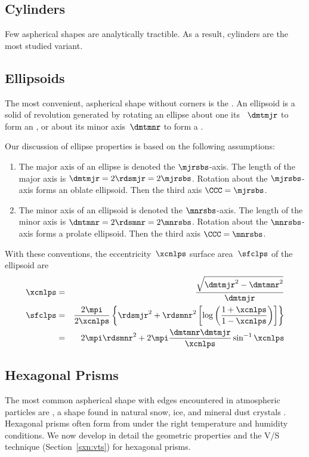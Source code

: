 \documentclass[12pt,twoside]{book}
\begin{document}
\subsection[Cylinders]{Cylinders}\label{sxn:cyl}
Few aspherical shapes are analytically tractible.
As a result, cylinders are the most studied variant.

\subsection[Ellipsoids]{Ellipsoids}\label{sxn:lps}
The most convenient, aspherical shape without corners is the 
.
An ellipsoid is a solid of revolution generated by rotating an
ellipse about one its ~$\dmtmjr$ to form an
, or about its minor axis~$\dmtmnr$
to form a .

Our discussion of ellipse properties is based on the following
assumptions:
\begin{enumerate}
\item The major axis of an ellipse is denoted the $\mjrsbs$-axis.
  The length of the major axis is $\dmtmjr = 2\rdsmjr = 2\mjrsbs$.
  Rotation about the $\mjrsbs$-axis forms an oblate ellipsoid.
  Then the third axis $\CCC = \mjrsbs$.
\item The minor axis of an ellipsoid is denoted the $\mnrsbs$-axis.
  The length of the minor axis is $\dmtmnr = 2\rdsmnr = 2\mnrsbs$.
  Rotation about the $\mnrsbs$-axis forms a prolate ellipsoid.
  Then the third axis $\CCC = \mnrsbs$.
\end{enumerate}
With these conventions, the eccentricity~$\xcnlps$ surface
area~$\sfclps$ of the ellipsoid are  
\begin{eqnarray}
\label{eqn:xcn_lps_dfn}
\xcnlps & = & \frac{\sqrt{\dmtmjr^{2}-\dmtmnr^{2}}}{\dmtmjr} \\
\label{eqn:sfc_lps_dfn}
\sfclps & = & \frac{2 \mpi}{2 \xcnlps}
\left\{\rdsmjr^{2} + \rdsmnr^{2}
\left[ \log \left( \frac{1 + \xcnlps}{1 - \xcnlps} \right) \right]
\right\} \nonumber \\
& = & 2 \mpi \rdsmnr^{2} + 2 \mpi \frac{\dmtmnr \dmtmjr}{\xcnlps} \sin^{-1} \xcnlps
\end{eqnarray}

\subsection[Hexagonal Prisms]{Hexagonal Prisms}\label{sxn:hxg}
The most common aspherical shape with edges encountered in atmospheric
particles are , a shape found in natural
snow, ice, and mineral dust crystals 
\cite[][]{AuV70,Hey72,Kno72,HeP84,Gin03,NGW03}.
Hexagonal prisms often form from  under the right 
temperature and humidity conditions.
We now develop in detail the geometric properties and the V/S
technique (Section~\ref{sxn:vts}) for hexagonal prisms.
\end{document}

